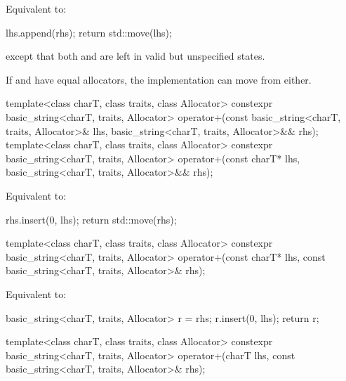 \begin{itemdescr}
\pnum
\effects
Equivalent to:
\begin{codeblock}
lhs.append(rhs);
return std::move(lhs);
\end{codeblock}
except that both  and 
are left in valid but unspecified states.
\begin{note}
If  and  have equal allocators,
the implementation can move from either.
\end{note}
\end{itemdescr}

%
\begin{itemdecl}
template<class charT, class traits, class Allocator>
  constexpr basic_string<charT, traits, Allocator>
    operator+(const basic_string<charT, traits, Allocator>& lhs,
              basic_string<charT, traits, Allocator>&& rhs);
template<class charT, class traits, class Allocator>
  constexpr basic_string<charT, traits, Allocator>
    operator+(const charT* lhs, basic_string<charT, traits, Allocator>&& rhs);
\end{itemdecl}

\begin{itemdescr}
\pnum
\effects
Equivalent to:
\begin{codeblock}
rhs.insert(0, lhs);
return std::move(rhs);
\end{codeblock}
\end{itemdescr}

%
\begin{itemdecl}
template<class charT, class traits, class Allocator>
  constexpr basic_string<charT, traits, Allocator>
    operator+(const charT* lhs, const basic_string<charT, traits, Allocator>& rhs);
\end{itemdecl}

\begin{itemdescr}
\pnum
\effects
Equivalent to:
\begin{codeblock}
basic_string<charT, traits, Allocator> r = rhs;
r.insert(0, lhs);
return r;
\end{codeblock}
\end{itemdescr}

%
\begin{itemdecl}
template<class charT, class traits, class Allocator>
  constexpr basic_string<charT, traits, Allocator>
    operator+(charT lhs, const basic_string<charT, traits, Allocator>& rhs);
\end{itemdecl}

